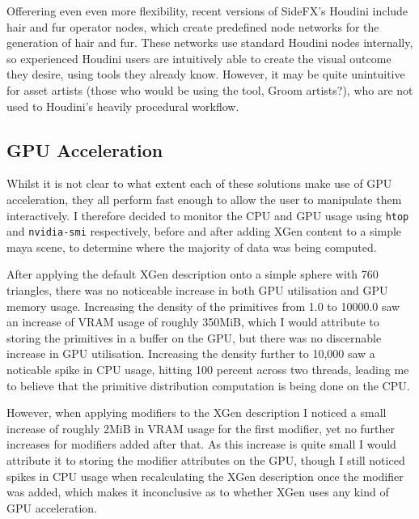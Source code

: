 \documentclass[]{acmsiggraph}
\begin{document}
Offerering even even more flexibility, recent versions of SideFX's Houdini include hair and fur operator nodes, which create predefined node networks for the generation of hair and fur. These networks use standard Houdini nodes internally, so experienced Houdini users are intuitively able to create the visual outcome they desire, using tools they already know. However, it may be quite unintuitive for asset artists (those who would be using the tool, Groom artists?), who are not used to Houdini's heavily procedural workflow.

\subsection{GPU Acceleration} \label{sec:existingGPU}
Whilst it is not clear to what extent each of these solutions make use of GPU acceleration, they all perform fast enough to allow the user to manipulate them interactively. I therefore decided to monitor the CPU and GPU usage using \verb|htop| and \verb|nvidia-smi| respectively, before and after adding XGen content to a simple maya scene, to determine where the majority of data was being computed.

After applying the default XGen description onto a simple sphere with 760 triangles, there was no noticeable increase in both GPU utilisation and GPU memory usage. Increasing the density of the primitives from 1.0 to 10000.0 saw an increase of VRAM usage of roughly 350MiB, which I would attribute to storing the primitives in a buffer on the GPU, but there was no discernable increase in GPU utilisation. Increasing the density further to 10,000 saw a noticable spike in CPU usage, hitting 100 percent across two threads, leading me to believe that the primitive distribution computation is being done on the CPU.

However, when applying modifiers to the XGen description I noticed a small increase of roughly 2MiB in VRAM usage for the first modifier, yet no further increases for modifiers added after that. As this increase is quite small I would attribute it to storing the modifier attributes on the GPU, though I still noticed spikes in CPU usage when recalculating the XGen description once the modifier was added, which makes it inconclusive as to whether XGen uses any kind of GPU acceleration.

\end{document}
